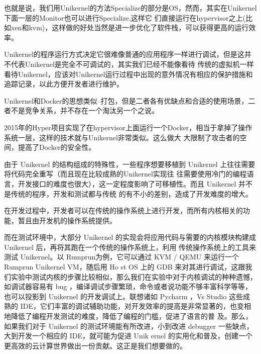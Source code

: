 \documentclass[fontsize=13pt, %
    paper=a4, %
    twoside, %
    captions=tableheading,
    index=totoc,
    hyperref]{labbook}
\begin{document}
\begin{spacing}{1.0}
\begin{addmargin}[4cm]{0cm}
也就是说，我们用Unikernel的方法Specialize的部分是OS，然而，其实在Unikernel下面一层的Monitor也可以进行Specialize,这样它
们直接运行在hypervisor之上(比如xen和kvm)，这样做的好处当然是进一步优化了软件栈，可以获得更高的运行效率。


Unikernel的程序运行方式决定它很难像普通的应用程序一样进行调试，但是这并不代表Unikernel是完全不可调试的，其实我们已经不能像看待
传统的虚拟机一样看待Unikernel，应该对Unikernel运行过程中出现的意外情况有相应的保护措施和追踪记录，以此方便开发者进行维护。


Unikernel和Docker的思想类似--打包，但是二者各有优缺点和合适的使用场景，二者不是竞争关系，并不存在一个淘汰另一个之说。

2015年的Hyper项目实现了在hypervisor上面运行一个Docker，相当于拿掉了操作系统一层，这样的技术就与Unikernel非常类似。这么做大
大限制了攻击者的空间，提高了Docker的安全性。



由于 Unikernel 的结构组成的特殊性，一些程序想要移植到 Unikernel 上往往需要将代码完全重写（而且现在比较成熟的Unikernel实现往
往需要使用冷门的编程语言，开发接口的难度也很大），这一定程度影响了可移植性。而且 Unikernel 并不是传统的程序，开发和测试都与传统
的有不小的差别，造成了开发难度的增大。

在开发过程中，开发者可以在传统的操作系统上进行开发，而所有内核相关的功能，暂且由开发机的操作系统提供。

而在测试环境中，大部分 Unikernel 的实现会将应用代码与需要的内核模块构建成 Unikernel 后，再将其跑在一个传统的操作系统上，利用
传统操作系统上的工具来测试 Unikernel。以 Rumprun为例，它可以通过 KVM / QEMU 来运行一个 Rumprun Unikernel VM，随后用 Ho
st OS 上的 GDB 来对其进行调试，这跟我们实验中测试内核的步骤比较相似，那么我们在实验中对于内核调试的种种遗憾，如调试器容易有 bug
，编译调试步骤繁琐，命令或者说功能不够丰富科学等等，也可以投影到 Unikernel 的开发调试上。联想诸如 Pycharm ，Vs Studio 这些成
熟的 IDE，它们丰富的调试辅助功能，对开发效率的提高是非常显著的，也变相地降低了编程开发测试的难度，降低了编程的门槛，促进了语言的普
及。那么，如果我们对于 Unikernel 的测试环境能有所改进，小到改进 debugger 一些缺点，大到开发一个相应的 IDE，就可能为促进 Unik
ernel 的实用化和普及，创建一个更高效的云计算世界做出一份贡献。这正是我们想要做的。


\end{addmargin}
\end{spacing}
\end{document}
